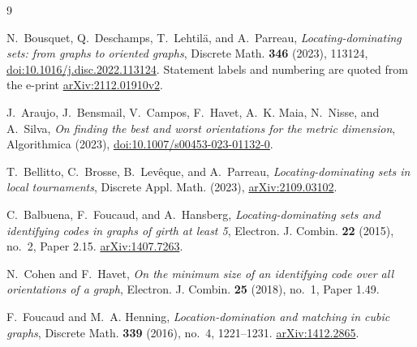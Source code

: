\documentclass[11pt]{amsart}
\theoremstyle{definition}
\theoremstyle{remark}
\begin{document}
\begin{thebibliography}{9}

N.~Bousquet, Q.~Deschamps, T.~Lehtil\"a, and A.~Parreau,
\emph{Locating-dominating sets: from graphs to oriented graphs},
Discrete Math. \textbf{346} (2023), 113124,
\href{https://doi.org/10.1016/j.disc.2022.113124}{doi:10.1016/j.disc.2022.113124}.
Statement labels and numbering are quoted from the e-print
\href{https://arxiv.org/abs/2112.01910}{arXiv:2112.01910v2}.

J.~Araujo, J.~Bensmail, V.~Campos, F.~Havet, A.~K. Maia, N.~Nisse, and
A.~Silva,
\emph{On finding the best and worst orientations for the metric dimension},
Algorithmica (2023),
\href{https://doi.org/10.1007/s00453-023-01132-0}{doi:10.1007/s00453-023-01132-0}.

T.~Bellitto, C.~Brosse, B.~Lev\^eque, and A.~Parreau,
\emph{Locating-dominating sets in local tournaments},
Discrete Appl. Math. (2023),
\href{https://arxiv.org/abs/2109.03102}{arXiv:2109.03102}.

C.~Balbuena, F.~Foucaud, and A.~Hansberg,
\emph{Locating-dominating sets and identifying codes in graphs of girth at
least 5},
Electron. J. Combin. \textbf{22} (2015), no.~2, Paper 2.15.
\href{https://arxiv.org/abs/1407.7263}{arXiv:1407.7263}.

N.~Cohen and F.~Havet,
\emph{On the minimum size of an identifying code over all orientations of a
graph},
Electron. J. Combin. \textbf{25} (2018), no.~1, Paper 1.49.

F.~Foucaud and M.~A. Henning,
\emph{Location-domination and matching in cubic graphs},
Discrete Math. \textbf{339} (2016), no.~4, 1221--1231.
\href{https://arxiv.org/abs/1412.2865}{arXiv:1412.2865}.

\end{thebibliography}
\end{document}
